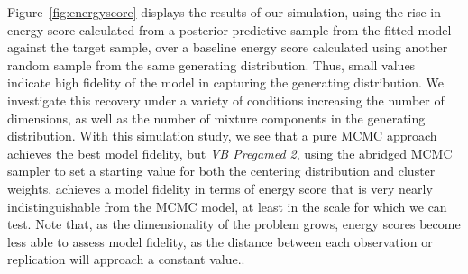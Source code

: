 Figure~\ref{fig:energyscore} displays the results of our simulation, using the rise in energy score 
    calculated from a posterior predictive sample from the fitted model against the target 
    sample, over a baseline energy score calculated using another random sample from the same 
    generating distribution.  Thus, small values indicate high fidelity of the model in 
    capturing the generating distribution. We investigate this recovery under a variety of 
    conditions increasing the number of dimensions, as well as the number of mixture components 
    in the generating distribution. With this simulation study, we see that
    a pure MCMC approach achieves the best model fidelity, but \emph{VB Pregamed 2}, using 
    the abridged MCMC sampler to set a starting value for both the centering distribution 
    and cluster weights, achieves a model fidelity in terms of energy score that is very
    nearly indistinguishable from the MCMC model, at least in the scale for which we can test.
    Note that, as the dimensionality of the problem grows, energy scores become less able to assess 
    model fidelity, as the distance between each observation or replication will approach a 
    constant value..

